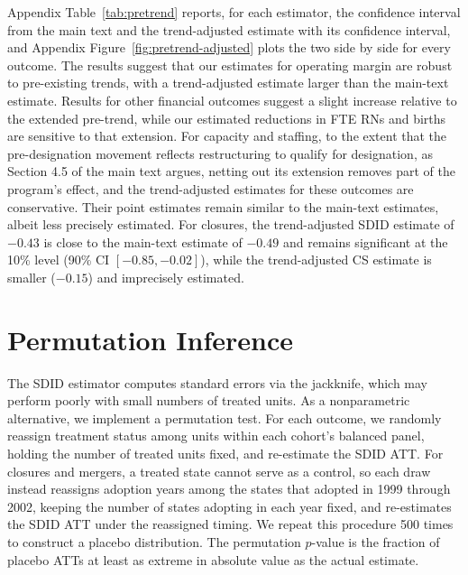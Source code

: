 \documentclass[a4paper, 12pt]{article}
\begin{document}
Appendix Table~\ref{tab:pretrend} reports, for each estimator, the confidence interval from the main text and the trend-adjusted estimate with its confidence interval, and Appendix Figure~\ref{fig:pretrend-adjusted} plots the two side by side for every outcome. The results suggest that our estimates for operating margin are robust to pre-existing trends, with a trend-adjusted estimate larger than the main-text estimate. Results for other financial outcomes suggest a slight increase relative to the extended pre-trend, while our estimated reductions in FTE RNs and births are sensitive to that extension. For capacity and staffing, to the extent that the pre-designation movement reflects restructuring to qualify for designation, as Section 4.5 of the main text argues, netting out its extension removes part of the program's effect, and the trend-adjusted estimates for these outcomes are conservative. Their point estimates remain similar to the main-text estimates, albeit less precisely estimated. For closures, the trend-adjusted SDID estimate of $-0.43$ is close to the main-text estimate of $-0.49$ and remains significant at the 10\% level (90\% CI $[-0.85, -0.02]$), while the trend-adjusted CS estimate is smaller ($-0.15$) and imprecisely estimated.



\section{Permutation Inference}
\label{sec:app-perm}

The SDID estimator computes standard errors via the jackknife, which may perform poorly with small numbers of treated units. As a nonparametric alternative, we implement a permutation test. For each outcome, we randomly reassign treatment status among units within each cohort's balanced panel, holding the number of treated units fixed, and re-estimate the SDID ATT. For closures and mergers, a treated state cannot serve as a control, so each draw instead reassigns adoption years among the states that adopted in 1999 through 2002, keeping the number of states adopting in each year fixed, and re-estimates the SDID ATT under the reassigned timing. We repeat this procedure 500 times to construct a placebo distribution. The permutation $p$-value is the fraction of placebo ATTs at least as extreme in absolute value as the actual estimate.
\end{document}
